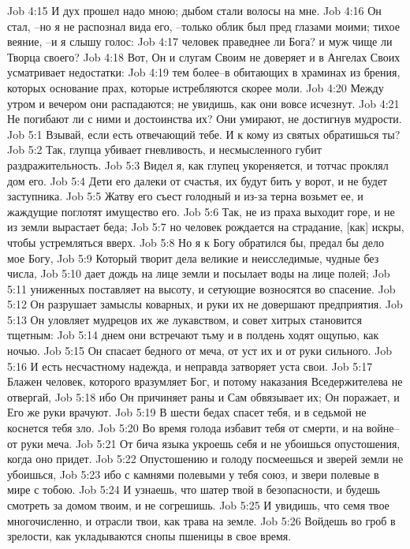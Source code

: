 Job 4:15  И дух прошел надо мною; дыбом стали волосы на мне.
Job 4:16  Он стал, --но я не распознал вида его, --только облик был пред глазами моими; тихое веяние, --и я слышу голос:
Job 4:17  человек праведнее ли Бога? и муж чище ли Творца своего?
Job 4:18  Вот, Он и слугам Своим не доверяет и в Ангелах Своих усматривает недостатки:
Job 4:19  тем более--в обитающих в храминах из брения, которых основание прах, которые истребляются скорее моли.
Job 4:20  Между утром и вечером они распадаются; не увидишь, как они вовсе исчезнут.
Job 4:21  Не погибают ли с ними и достоинства их? Они умирают, не достигнув мудрости.
Job 5:1  Взывай, если есть отвечающий тебе. И к кому из святых обратишься ты?
Job 5:2  Так, глупца убивает гневливость, и несмысленного губит раздражительность.
Job 5:3  Видел я, как глупец укореняется, и тотчас проклял дом его.
Job 5:4  Дети его далеки от счастья, их будут бить у ворот, и не будет заступника.
Job 5:5  Жатву его съест голодный и из-за терна возьмет ее, и жаждущие поглотят имущество его.
Job 5:6  Так, не из праха выходит горе, и не из земли вырастает беда;
Job 5:7  но человек рождается на страдание, [как] искры, чтобы устремляться вверх.
Job 5:8  Но я к Богу обратился бы, предал бы дело мое Богу,
Job 5:9  Который творит дела великие и неисследимые, чудные без числа,
Job 5:10  дает дождь на лице земли и посылает воды на лице полей;
Job 5:11  униженных поставляет на высоту, и сетующие возносятся во спасение.
Job 5:12  Он разрушает замыслы коварных, и руки их не довершают предприятия.
Job 5:13  Он уловляет мудрецов их же лукавством, и совет хитрых становится тщетным:
Job 5:14  днем они встречают тьму и в полдень ходят ощупью, как ночью.
Job 5:15  Он спасает бедного от меча, от уст их и от руки сильного.
Job 5:16  И есть несчастному надежда, и неправда затворяет уста свои.
Job 5:17  Блажен человек, которого вразумляет Бог, и потому наказания Вседержителева не отвергай,
Job 5:18  ибо Он причиняет раны и Сам обвязывает их; Он поражает, и Его же руки врачуют.
Job 5:19  В шести бедах спасет тебя, и в седьмой не коснется тебя зло.
Job 5:20  Во время голода избавит тебя от смерти, и на войне--от руки меча.
Job 5:21  От бича языка укроешь себя и не убоишься опустошения, когда оно придет.
Job 5:22  Опустошению и голоду посмеешься и зверей земли не убоишься,
Job 5:23  ибо с камнями полевыми у тебя союз, и звери полевые в мире с тобою.
Job 5:24  И узнаешь, что шатер твой в безопасности, и будешь смотреть за домом твоим, и не согрешишь.
Job 5:25  И увидишь, что семя твое многочисленно, и отрасли твои, как трава на земле.
Job 5:26  Войдешь во гроб в зрелости, как укладываются снопы пшеницы в свое время.
